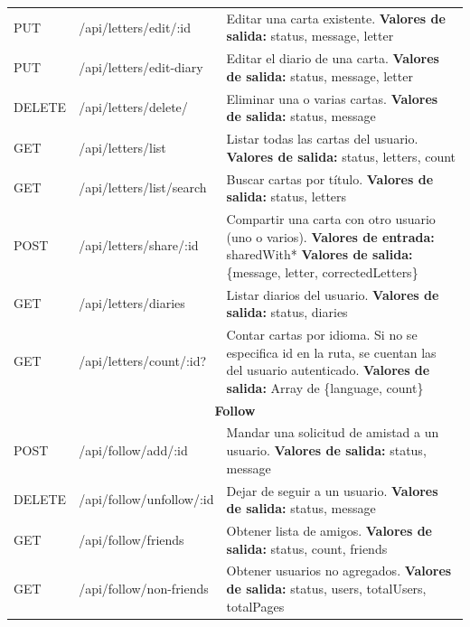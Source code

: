 \begin{longtable}{|l|p{5cm}|p{8cm}|}
PUT & /api/letters/edit/:id & Editar una carta existente. \newline \textbf{Valores de salida:} status, message, letter \\
PUT & /api/letters/edit-diary & Editar el diario de una carta. \newline \textbf{Valores de salida:} status, message, letter \\
DELETE & /api/letters/delete/ & Eliminar una o varias cartas. \newline \textbf{Valores de salida:} status, message \\
GET & /api/letters/list & Listar todas las cartas del usuario. \newline \textbf{Valores de salida:} status, letters, count \\
GET & /api/letters/list/search & Buscar cartas por título. \newline \textbf{Valores de salida:} status, letters \\
POST & /api/letters/share/:id & Compartir una carta con otro usuario (uno o varios). \newline \textbf{Valores de entrada:} shared\-With* \newline \textbf{Valores de salida:} \{message, letter, correctedLetters\} \\
GET & /api/letters/diaries & Listar diarios del usuario. \newline \textbf{Valores de salida:} status, diaries \\
GET & /api/letters/count/:id? & Contar cartas por idioma. Si no se especifica id en la ruta, se cuentan las del usuario autenticado. \newline \textbf{Valores de salida:} Array de \{language, count\} \\
\hline
\hline
\multicolumn{3}{|c|}{\textbf{Follow}} \\
\hline
POST & /api/follow/add/:id & Mandar una solicitud de amistad a un usuario. \newline \textbf{Valores de salida:} status, message \\
DELETE & /api/follow/unfollow/:id & Dejar de seguir a un usuario. \newline \textbf{Valores de salida:} status, message \\
GET & /api/follow/friends & Obtener lista de amigos. \newline \textbf{Valores de salida:} status, count, friends \\
GET & /api/follow/non-friends & Obtener usuarios no agregados. \newline \textbf{Valores de salida:} status, users, totalUsers, totalPages \\

\end{longtable}
